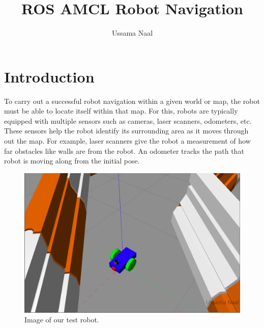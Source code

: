 \documentclass[10pt,journal,compsoc]{IEEEtran}
\begin{document}
\title{ROS AMCL Robot Navigation}

\author{Ussama Naal}

%
{}


\maketitle
\IEEEdisplaynontitleabstractindextext
\IEEEpeerreviewmaketitle
\section{Introduction}
\label{sec:introduction}

\IEEEPARstart To carry out a successful robot navigation within a given world or map, the robot must be able to locate itself within that map. For this, robots are typically equipped with multiple sensors such as cameras, laser scanners, odometers, etc. These sensors help the robot identify its surrounding area as it moves through out the map. For example, laser scanners give the robot a measurement of how far obstacles like walls are from the robot. An odometer tracks the path that robot is moving along from the initial pose.

\begin{figure}[thpb]
      \centering
      \includegraphics[width=\linewidth]{robot-image.png}
      \caption{Image of our test robot.}
      \label{fig:cnn-classifier}
\end{figure}
\end{document}
